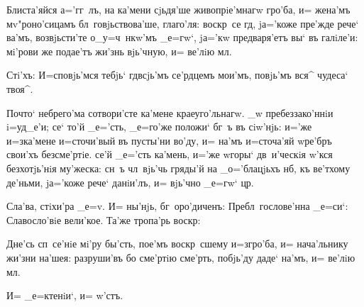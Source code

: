 Блиста'яйся а='гг~лъ, на ка'мени сjьдя'ше 
живопрiе'мнагw гро'ба, и= жена'мъ мv"роно'сицамъ 
бл~говjьствова'ше, глаго'ля: воскр~се гд, jа='коже 
пре'жде рече` ва'мъ, возвjьсти'те о_у=ч~нкw'мъ _е=гw`, 
jа='кw предваря'етъ вы` въ галiле'и: мi'рови же подае'тъ 
жи'знь вjь'чную, и= ве'лiю мл.

Стi'хъ: И=сповjь'мся тебjь` гд всjь'мъ се'рдцемъ 
мои'мъ, повjь'мъ вся^ чудеса` твоя^.

Почто` небрего'ма сотвори'сте ка'мене краеуго'льнагw. 
_w пребеззако'ннiи i=уд_е'и; се` то'й _е='сть, _е=го'же 
положи` бг~ъ въ сiw'нjь: и='же и=з\ъ ка'мене и=сточи'вый 
въ пусты'ни во'ду, и= на'мъ и=сточа'яй w\т ре'бръ свои'хъ 
безсме'ртiе. се'й _е='сть ка'мень, и='же w\т горы` 
дв~и'ческiя w'кся без\ъ хотjь'нiя му'жеска: сн~ъ 
чл~вjь'чь гряды'й на _о='блацjьхъ нб, къ ве'тхому 
де'ньми, jа='коже рече` данiи'лъ, и= вjь'чно _е=гw` 
цр.

Сла'ва, стiхи'ра _е=v. И= ны'нjь, 
бг~оро'диченъ: Пребл~гослове'нна _е=си`: Славосло'вiе 
вели'кое. Та'же тропа'рь воскр:

Дне'сь сп~се'нiе мi'ру бы'сть, пое'мъ воскр~сшему 
и=з\ъ гро'ба, и= нача'льнику жи'зни на'шея: разруши'въ бо 
сме'ртiю сме'рть, побjь'ду даде` на'мъ, и= ве'лiю мл.

И= _е=ктенiи`, и= w'стъ.

